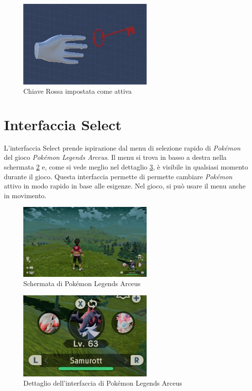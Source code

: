 \documentclass[target=bach,aauheader=]{thud}
\begin{document}
\begin{figure}[h]
    \centering
    \includegraphics[width=0.60\textwidth]{key_red}
    \caption{Chiave Rossa impostata come attiva}
    \label{fig:key_red}
\end{figure}

\section{Interfaccia Select} %
\label{select}
L'interfaccia Select prende ispirazione dal menu di selezione rapido di \textit{Pokémon} del gioco \textit{Pokémon Legends Arceus}. 
Il menu si trova in basso a destra nella schermata \ref{fig:pok1} e, come si vede meglio nel dettaglio \ref{fig:pok2},  è visibile in qualsiasi momento durante il gioco.
Questa interfaccia permette di permette cambiare \textit{Pokémon} attivo in modo rapido in base alle esigenze. 
Nel gioco, si può usare il menu anche in movimento.

\begin{figure}[h]
    \centering
    \includegraphics[width=0.60\textwidth]{pok1}
    \caption{Schermata di Pokémon Legends Arceus}
    \label{fig:pok1}
\end{figure}

\begin{figure}[h]
    \centering
    \includegraphics[width=0.60\textwidth]{pok2}
    \caption{Dettaglio dell'interfaccia di Pokémon Legends Arceus}
    \label{fig:pok2}
\end{figure}
\end{document}

